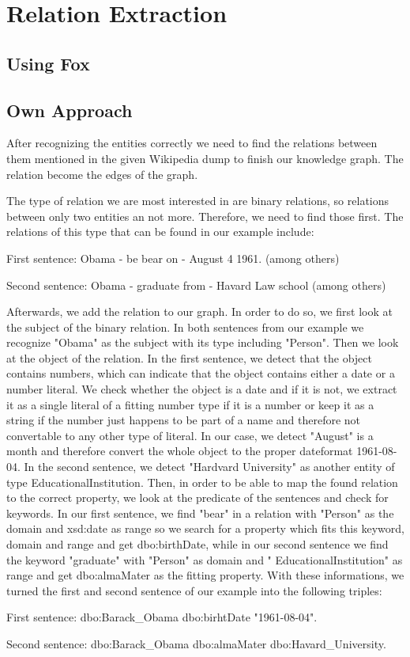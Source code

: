\documentclass[runningheads]{llncs}
\begin{document}
\section{Relation Extraction}

\subsection{Using Fox}
\subsection{Own Approach}
After recognizing the entities correctly we need to find the relations between them mentioned in the given Wikipedia dump to finish our knowledge graph. The relation become the edges of the graph.

The type of relation we are most interested in are binary relations, so relations between only two entities an not more. Therefore, we need to find those first. The relations of this type that can be found in our example include:
\begin{example}
First sentence: Obama - be bear on - August 4 1961. (among others)

Second sentence: Obama - graduate from - Havard Law school (among others)\end{example}

Afterwards, we add the relation to our graph. In order to do so, we first look at the subject of the binary relation. In both sentences from our example we recognize "Obama" as the subject with its type including "Person". Then we look at the object of the relation. In the first sentence, we detect that the object contains numbers, which can indicate that the object contains either a date or a number literal. We check whether the object is a date and if it is not, we extract it as a single literal of a fitting number type if it is a number or keep it as a string if the number just happens to be part of a name and therefore not convertable to any other type of literal. In our case, we detect "August" is a month and therefore convert the whole object to the proper dateformat 1961-08-04. In the second sentence, we detect "Hardvard University" as another entity of type EducationalInstitution. Then, in order to be able to map the found relation to the correct property, we look at the predicate of the sentences and check for keywords. In our first sentence, we find "bear" in a relation with "Person" as the domain and xsd:date as range so we search for a property which fits this keyword, domain and range and get dbo:birthDate, while in our second sentence we find the keyword "graduate" with "Person" as domain and " EducationalInstitution" as range and get dbo:almaMater as the fitting property. With these informations, we turned the first and second sentence of our example into the following triples:
\begin{example} First sentence: dbo:Barack\_Obama dbo:birhtDate "1961-08-04".
	
	Second sentence: dbo:Barack\_Obama dbo:almaMater dbo:Havard\_University.\end{example}
\end{document}
